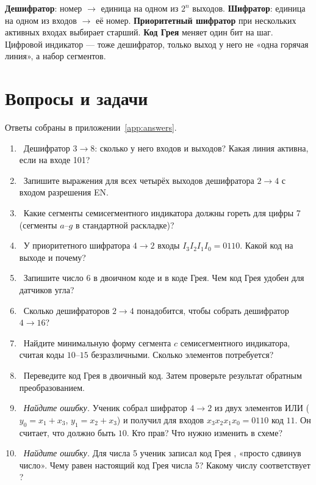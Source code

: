 \begin{ideabox}
\textbf{Дешифратор}: номер $\to$ единица на одном из $2^n$ выходов.
\textbf{Шифратор}: единица на одном из входов $\to$ её номер.
\textbf{Приоритетный шифратор} при нескольких активных входах выбирает старший.
\textbf{Код Грея} меняет один бит на шаг. Цифровой индикатор --- тоже
дешифратор, только выход у него не «одна горячая линия», а набор сегментов.
\end{ideabox}

\section{Вопросы и задачи}
\label{sec:tasks-coders}

Ответы собраны в приложении~\ref{app:answers}.

\begin{taskbox}
\begin{enumerate}
  \item {}~Дешифратор $3\to 8$: сколько у него входов и выходов? Какая линия активна, если на входе 101?
  \item {}~Запишите выражения для всех четырёх выходов дешифратора $2\to 4$ с входом разрешения EN.
  \item {}~Какие сегменты семисегментного индикатора должны гореть для цифры 7 (сегменты $a$--$g$ в стандартной раскладке)?
  \item {}~У приоритетного шифратора $4\to 2$ входы $I_3I_2I_1I_0 = 0110$. Какой код на выходе и почему?
  \item {}~Запишите число 6 в двоичном коде и в коде Грея. Чем код Грея удобен для датчиков угла?
  \item {}~Сколько дешифраторов $2\to 4$ понадобится, чтобы собрать дешифратор $4\to 16$?
  \item {}~Найдите минимальную форму сегмента $c$ семисегментного индикатора, считая коды $10$--$15$ безразличными. Сколько элементов потребуется?
  \item {}~Переведите код Грея  в двоичный код. Затем проверьте результат обратным преобразованием.
  \item {}~\emph{Найдите ошибку.} Ученик собрал шифратор $4\to2$ из двух элементов ИЛИ ($y_0=x_1+x_3$, $y_1=x_2+x_3$) и получил для входов $x_3x_2x_1x_0=0110$ код $11$. Он считает, что должно быть $10$. Кто прав? Что нужно изменить в схеме?
  \item {}~\emph{Найдите ошибку.} Для числа 5 ученик записал код Грея , «просто сдвинув число». Чему равен настоящий код Грея числа 5? Какому числу соответствует ?

\end{enumerate}
\end{taskbox}

